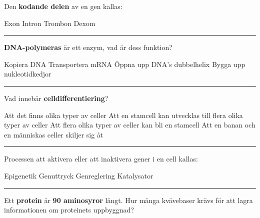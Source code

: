 \documentclass{exam}
\begin{document}
\begin{questions}
\question  Den \textbf{kodande delen} av en gen kallas:
\begin{checkboxes}
   \choice Exon
   \choice Intron
   \choice Trombon
   \choice Dexom 
\end{checkboxes}

\vspace{5mm} %
\hrule 
\vspace{5mm} %
\question  \textbf{DNA-polymeras} är ett enzym, vad är dess funktion?
\begin{checkboxes}
   \choice Kopiera DNA
   \choice Transportera mRNA
   \choice Öppna upp DNA's dubbelhelix
   \choice Bygga upp nukleotidkedjor 
\end{checkboxes}

\vspace{5mm} %
\hrule 
\vspace{5mm} %
\question  Vad innebär \textbf{celldifferentiering}?
\begin{checkboxes}
   \choice Att det finns olika typer av celler
   \choice Att en stamcell kan utvecklas till flera olika typer av celler
   \choice Att flera olika typer av celler kan bli en stamcell
   \choice Att en banan och en människas celler skiljer sig åt 
\end{checkboxes}

\vspace{5mm} %
\hrule 
\vspace{5mm} %
\question  Processen att aktivera eller att inaktivera gener i en cell kallas:
\begin{checkboxes}
   \choice Epigenetik
   \choice Genuttryck
   \choice Genreglering
   \choice Katalysator 
\end{checkboxes}

\vspace{5mm} %
\hrule 
\vspace{5mm} %
\question  Ett \textbf{protein} är \textbf{90 aminosyror} långt. Hur många kvävebaser krävs för att lagra informationen om proteinets uppbyggnad?
\begin{checkboxes}
\end{checkboxes}
\end{questions}
\break
\vspace{5mm} %
\begin{center}
\end{center}
\end{document}
